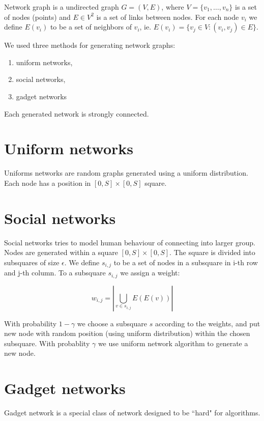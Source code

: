 \documentclass[a4paper,draft,12pt]{report}
\begin{document}
Network graph is a undirected graph $G = (V, E)$, where $V = \{v_1, \ldots, v_n\}$ is a set of nodes (points) and $E \in V^2$ is a set of links between nodes. For each node $v_i$ we define $E(v_i)$ to be a set of neighbors of $v_i$, ie. $E(v_i) = \{ v_j \in V : (v_i, v_j) \in E\}$.

We used three methods for generating network graphs:
\begin{enumerate}
\item uniform networks,
\item social networks,
\item gadget networks
\end{enumerate}

\noindent Each generated network is strongly connected.

\section{Uniform networks}

Uniforms networks are random graphs generated using a uniform distribution. Each node has a position in $[0, S] \times [0, S]$ square.

\section{Social networks}

Social networks tries to model human behaviour of connecting into larger group. Nodes are generated within a square $[0, S] \times [0, S]$. The square is divided into subsquares of size $\epsilon$. We define $s_{i,j}$ to be a set of nodes in a subsquare in i-th row and j-th column. To a subsquare $s_{i,j}$ we assign a weight:

\begin{equation*}
w_{i,j} = \left| \bigcup_{v \in s_{i,j}} E(E(v)) \right|
\end{equation*}

With probability $1 - \gamma$ we choose a subsquare $s$ according to the weights, and put new node with random position (using uniform distribution) within the chosen subsquare. With probablity $\gamma$ we use uniform network algorithm to generate a new node.

\section{Gadget networks}

Gadget network is a special class of network designed to be  ``hard" for algorithms.
\end{document}
